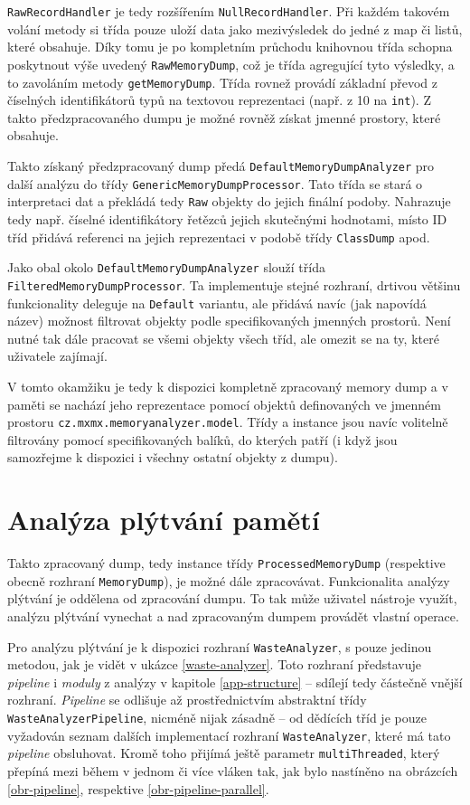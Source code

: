 \texttt{RawRecordHandler} je tedy rozšířením \texttt{NullRecordHandler}. Při každém takovém volání metody si třída pouze uloží data jako mezivýsledek do jedné z map či listů, které obsahuje. Díky tomu je po kompletním průchodu knihovnou třída schopna poskytnout výše uvedený \texttt{RawMemoryDump}, což je třída agregující tyto výsledky, a to zavoláním metody \texttt{getMemoryDump}. Třída rovnež provádí základní převod z číselných identifikátorů typů na textovou reprezentaci (např. z 10 na \texttt{int}). Z takto předzpracovaného dumpu je možné rovněž získat jmenné prostory, které obsahuje. 

Takto získaný předzpracovaný dump předá \texttt{DefaultMemoryDumpAnalyzer} pro další analýzu do třídy \texttt{GenericMemoryDumpProcessor}. Tato třída se stará o interpretaci dat a překládá tedy \texttt{Raw} objekty do jejich finální podoby. Nahrazuje tedy např. číselné identifikátory řetězců jejich skutečnými hodnotami, místo ID tříd přidává referenci na jejich reprezentaci v podobě třídy \texttt{ClassDump} apod.

Jako obal okolo \texttt{DefaultMemoryDumpAnalyzer} slouží třída \texttt{Filtered\-Memory\-Dump\-Processor}. Ta implementuje stejné rozhraní, drtivou většinu funkcionality deleguje na \texttt{Default} variantu, ale přidává navíc (jak napovídá název) možnost filtrovat objekty podle specifikovaných jmenných prostorů. Není nutné tak dále pracovat se všemi objekty všech tříd, ale omezit se na ty, které uživatele zajímají.

V tomto okamžiku je tedy k dispozici kompletně zpracovaný memory dump a v paměti se nachází jeho reprezentace pomocí objektů definovaných ve jmenném prostoru \texttt{cz.mxmx.memoryanalyzer.model}. Třídy a instance jsou navíc volitelně filtrovány pomocí specifikovaných balíků, do kterých patří (i když jsou samozřejme k dispozici i všechny ostatní objekty z dumpu).

\section{Analýza plýtvání pamětí}

Takto zpracovaný dump, tedy instance třídy \texttt{ProcessedMemoryDump} (respektive obecně rozhraní \texttt{MemoryDump}), je možné dále zpracovávat. Funkcionalita analýzy plýtvání je oddělena od zpracování dumpu. To tak může uživatel nástroje využít, analýzu plýtvání vynechat a nad zpracovaným dumpem provádět vlastní operace.

Pro analýzu plýtvání je k dispozici rozhraní \texttt{WasteAnalyzer}, s pouze jedinou metodou, jak je vidět v ukázce \ref{waste-analyzer}. Toto rozhraní představuje \textit{pipeline} i \textit{moduly} z analýzy v kapitole \ref{app-structure} -- sdílejí tedy částečně vnější rozhraní. \textit{Pipeline} se odlišuje až prostřednictvím abstraktní třídy \texttt{WasteAnalyzerPipeline}, nicméně nijak zásadně -- od dědících tříd je pouze vyžadován seznam dalších implementací rozhraní \texttt{WasteAnalyzer}, které má tato \textit{pipeline} obsluhovat. Kromě toho přijímá ještě parametr \texttt{multiThreaded}, který přepíná mezi během v jednom či více vláken tak, jak bylo nastíněno na obrázcích \ref{obr-pipeline}, respektive \ref{obr-pipeline-parallel}. 

